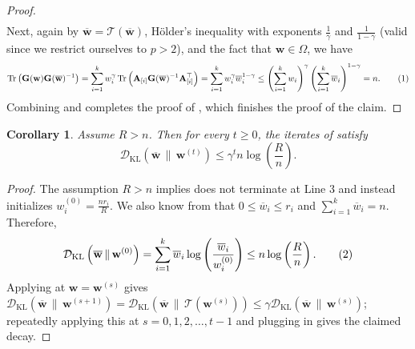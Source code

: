 \documentclass[11pt]{article}
\newcommand\numberthis{\addtocounter{equation}{1}\tag{\theequation}}
\theoremstyle{plain}
\newtheorem{corollary}[corollary]{Corollary}
\numberwithin{equation}{section}
\newcommand{\Tr}{\operatorname{Tr}}
\newcommand{\bG}{\mathbf{G}}
\newcommand{\bw}{\mathbf{w}}
\newcommand{\bwbar}{\overline{\mathbf{w}}}
\newcommand{\bAblk}[1]{\mathbf{A}_{[#1]}}
\newcommand{\wbar}{\overline{w}}
\newcommand{\calT}{\mathcal{T}}
\newcommand{\omrp}{\gamma}
\newcommand{\kldiv}[2]{\mathcal{D}_{\mathrm{KL}}\left(#1 \,\|\, #2\right)}
\begin{document}
\begin{proof}
\begin{align*}
\end{align*}
Next, again by $\bwbar=\calT(\bwbar)$, H\"older's inequality with exponents $\frac{1}{\omrp}$ and $\frac{1}{1-\omrp}$ (valid since we restrict ourselves to $p>2$), and the fact that $\bw\in\Omega$, we have \[ \Tr\left(\bG(\bw)\bG(\bwbar)^{-1}\right)
= \sum_{i=1}^k w_i^\omrp \Tr\left( \bAblk{i}\bG(\bwbar)^{-1} \bAblk{i}^\top\right) = \sum_{i=1}^k w_i^\omrp \wbar_i^{1-\omrp}\leq \left(\sum_{i=1}^k w_i\right)^\omrp \left(\sum_{i=1}^k \wbar_i\right)^{1-\omrp} = n. \numberthis\label{eq:KLcon-5}\]  Combining  and  completes the proof of , which finishes the proof of the claim. 
\end{proof}

\begin{corollary}\label{cor:kl-decay}Assume $R>n$. 
Then for every $t\geq0$, the iterates  of  satisfy \[\kldiv{\bwbar}{\bw^{(t)}}\leq\omrp^t n \log\left(\frac{R}{n}\right).\]
\end{corollary}
\begin{proof}
The assumption $R>n$ implies  does not terminate at Line 3 and instead initializes $w_i^{(0)} = \frac{nr_i}{R}$. We also know from  that $0\leq \wbar_i \leq r_i$ and $\sum_{i=1}^k \wbar_i = n$. Therefore, \[\kldiv{\bwbar}{\bw^{(0)}}= \sum_{i=1}^k \wbar_i\log\left(\frac{\wbar_i}{w^{(0)}_i}\right)\leq n\log\left(\frac{R}{n}\right). \numberthis\label{eq:cor-con-1}\]Applying  at $\bw = \bw^{(s)}$  gives $\kldiv{\bwbar}{\bw^{(s+1)}}= \kldiv{\bwbar}{\calT(\bw^{(s)})}\leq \omrp\kldiv{\bwbar}{\bw^{(s)}}$; repeatedly applying this at $s = 0, 1, 2, \dotsc, t-1$ and plugging in   gives the claimed decay. 
\end{proof} 
\end{document}
